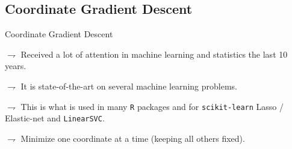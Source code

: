 \documentclass[xcolor={usenames,dvipsnames}]{beamer}
\begin{document}
\subsection{Coordinate Gradient Descent}


\begin{frame}{Coordinate Gradient Descent}

$\rightharpoondown$ Received a lot of attention in machine learning and statistics the last 10 years.
	
$\rightharpoondown$ It is \alert{state-of-the-art on several machine learning problems}.
	
$\rightharpoondown$ This is what is used in many \texttt{R} packages and for \texttt{scikit-learn} Lasso / Elastic-net and \texttt{LinearSVC}.


\bigskip


$\rightharpoondown$ Minimize \alert{one coordinate at a time} (keeping all others fixed).
\end{frame}


%	
%
%
\end{document}
